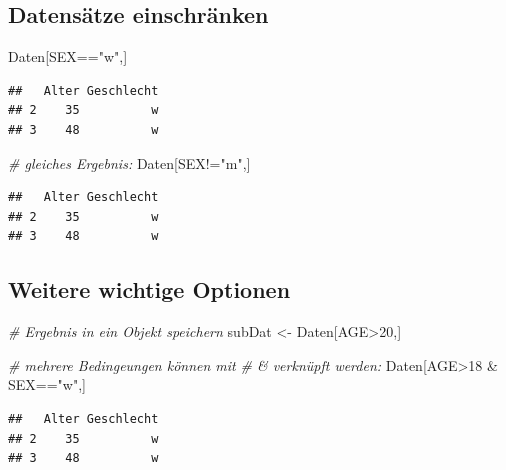 \documentclass[]{article}
\newenvironment{Shaded}{\begin{snugshade}}{\end{snugshade}}
\newcommand{\DecValTok}[1]{\textcolor[rgb]{0.00,0.00,0.81}{{#1}}}
\newcommand{\StringTok}[1]{\textcolor[rgb]{0.31,0.60,0.02}{{#1}}}
\newcommand{\CommentTok}[1]{\textcolor[rgb]{0.56,0.35,0.01}{\textit{{#1}}}}
\newcommand{\NormalTok}[1]{{#1}}
\begin{document}
\subsection{Datensätze einschränken}\label{datensatze-einschranken}

\begin{Shaded}
\begin{Highlighting}[]
\NormalTok{Daten[SEX==}\StringTok{"w"}\NormalTok{,]}
\end{Highlighting}
\end{Shaded}

\begin{verbatim}
##   Alter Geschlecht
## 2    35          w
## 3    48          w
\end{verbatim}

\begin{Shaded}
\begin{Highlighting}[]
\CommentTok{# gleiches Ergebnis:}
\NormalTok{Daten[SEX!=}\StringTok{"m"}\NormalTok{,]}
\end{Highlighting}
\end{Shaded}

\begin{verbatim}
##   Alter Geschlecht
## 2    35          w
## 3    48          w
\end{verbatim}

\subsection{Weitere wichtige Optionen}\label{weitere-wichtige-optionen}

\begin{Shaded}
\begin{Highlighting}[]
\CommentTok{# Ergebnis in ein Objekt speichern}
\NormalTok{subDat <-}\StringTok{ }\NormalTok{Daten[AGE>}\DecValTok{20}\NormalTok{,]}
\end{Highlighting}
\end{Shaded}

\begin{Shaded}
\begin{Highlighting}[]
\CommentTok{# mehrere Bedingeungen können mit}
\CommentTok{# & verknüpft werden:}
\NormalTok{Daten[AGE>}\DecValTok{18} \NormalTok{&}\StringTok{ }\NormalTok{SEX==}\StringTok{"w"}\NormalTok{,]}
\end{Highlighting}
\end{Shaded}

\begin{verbatim}
##   Alter Geschlecht
## 2    35          w
## 3    48          w
\end{verbatim}
\end{document}
